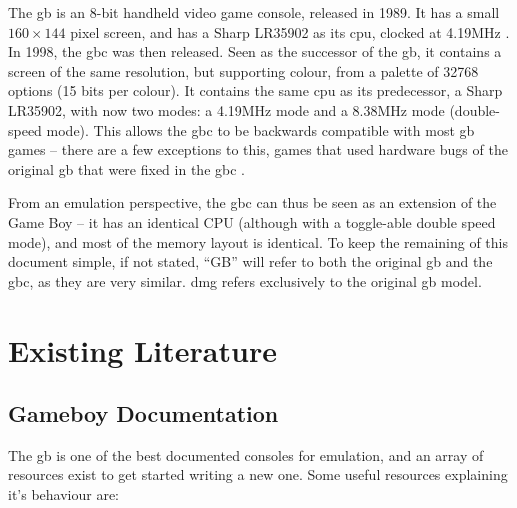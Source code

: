 \documentclass[11pt]{informatics-report}
\begin{document}
The \gls{gb} is an 8-bit handheld video game console, released in 1989. It has a small $160 \times 144$ pixel screen, and has a Sharp LR35902 as its \gls{cpu}, clocked at 4.19MHz \cite[Specifications]{pandoc}. In 1998, the \gls{gbc} was then released. Seen as the successor of the \gls{gb}, it contains a screen of the same resolution, but supporting colour, from a palette of 32768 options (15 bits per colour). It contains the same \gls{cpu} as its predecessor, a Sharp LR35902, with now two modes: a 4.19MHz mode and a 8.38MHz mode (double-speed mode). This allows the \gls{gbc} to be backwards compatible with most \gls{gb} games -- there are a few exceptions to this, games that used hardware bugs of the original \gls{gb} that were fixed in the \gls{gbc} \cite[STAT IRQ glitches]{bugs_in_emul}.

From an emulation perspective, the \glsdesc{gbc} can thus be seen as an extension of the Game Boy -- it has an identical CPU (although with a toggle-able double speed mode), and most of the memory layout is identical. To keep the remaining of this document simple, if not stated, ``GB'' will refer to both the original \glsdesc{gb} and the \glsdesc{gbc}, as they are very similar. \gls{dmg} refers exclusively to the original \glsdesc{gb} model.

\section{Existing Literature}

\subsection{Gameboy Documentation}

The \glsdesc{gb} is one of the best documented consoles for emulation, and an array of resources exist to get started writing a new one. Some useful resources explaining it's behaviour are:
\end{document}
